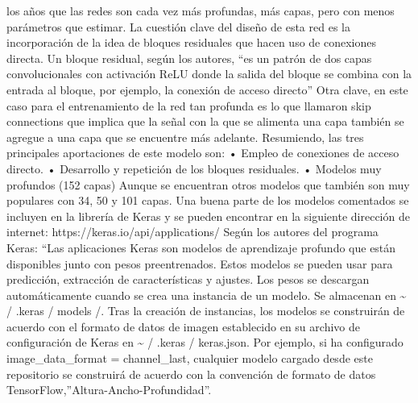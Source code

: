 \documentclass[
  a4paper,
  DIV=11,
  numbers=noendperiod]{scrreprt}
\begin{document}
los años que las redes son cada vez más profundas, más capas, pero con
menos parámetros que estimar. La cuestión clave del diseño de esta red
es la incorporación de la idea de bloques residuales que hacen uso de
conexiones directa. Un bloque residual, según los autores, ``es un
patrón de dos capas convolucionales con activación ReLU donde la salida
del bloque se combina con la entrada al bloque, por ejemplo, la conexión
de acceso directo'' Otra clave, en este caso para el entrenamiento de la
red tan profunda es lo que llamaron skip connections que implica que la
señal con la que se alimenta una capa también se agregue a una capa que
se encuentre más adelante. Resumiendo, las tres principales aportaciones
de este modelo son: • Empleo de conexiones de acceso directo. •
Desarrollo y repetición de los bloques residuales. • Modelos muy
profundos (152 capas) Aunque se encuentran otros modelos que también son
muy populares con 34, 50 y 101 capas. Una buena parte de los modelos
comentados se incluyen en la librería de Keras y se pueden encontrar en
la siguiente dirección de internet: https://keras.io/api/applications/
Según los autores del programa Keras: ``Las aplicaciones Keras son
modelos de aprendizaje profundo que están disponibles junto con pesos
preentrenados. Estos modelos se pueden usar para predicción, extracción
de características y ajustes. Los pesos se descargan automáticamente
cuando se crea una instancia de un modelo. Se almacenan en
\textasciitilde{} / .keras / models /. Tras la creación de instancias,
los modelos se construirán de acuerdo con el formato de datos de imagen
establecido en su archivo de configuración de Keras en \textasciitilde{}
/ .keras / keras.json. Por ejemplo, si ha configurado
image\_data\_format = channel\_last, cualquier modelo cargado desde este
repositorio se construirá de acuerdo con la convención de formato de
datos TensorFlow,''Altura-Ancho-Profundidad''.
\end{document}
